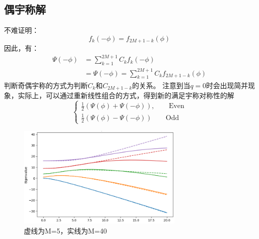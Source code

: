 \documentclass[a4paper]{ctexart}
\begin{document}
\subsection{偶宇称解}
不难证明：
\begin{equation}
f_k(-\phi)=f_{2M+1-k}(\phi)
\end{equation}
因此，有：
\begin{equation}
\begin{aligned}
\Psi(-\phi)&=\sum_{k=1}^{2 M+1} C_{k} f_{k}(-\phi)\\
&=\Psi(-\phi)=\sum_{k=1}^{2 M+1} C_{k} f_{2M+1-k}(\phi)
\end{aligned}
\end{equation}
判断奇偶宇称的方式为判断$C_k$和$C_{2M+1-k}$的关系。
注意到当$q=0$时会出现简并现象，实际上，可以通过重新线性组合的方式，得到新的满足宇称对称性的解
\begin{equation}
\left\{\begin{array}{l}{\frac{1}{2}(\Psi(\phi)+\Psi(-\phi))},\qquad \text{Even} \\ {\frac{1}{2}(\Psi(\phi)-\Psi(-\phi))}\qquad \text{Odd}\end{array}\right.
\end{equation}
\begin{figure}[hbt]
	\centering
	\includegraphics[width=8cm]{./fig/Eigen_2.png}
	\caption{虚线为M=5，实线为M=40}
\end{figure}
\end{document}
